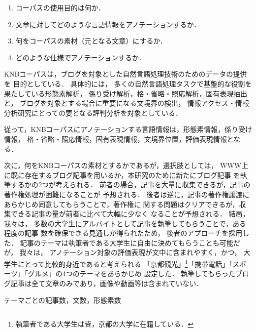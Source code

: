 \documentclass[japanese]{jnlp_JS2.0}
\begin{document}
\begin{enumerate}
 \item コーパスの使用目的は何か．
 \item 文章に対してどのような言語情報をアノテーションするか．
 \item 何をコーパスの素材（元となる文章）にするか．
 \item どのような仕様でアノテーションするか．
\end{enumerate}

KNBコーパスは，ブログを対象とした自然言語処理技術のためのデータの提供を
目的としている．
具体的には，
多くの自然言語処理タスクで基盤的な役割を果たしている形態素解析，
係り受け解析，格・省略・照応解析，固有表現抽出と，
ブログを対象とする場合に重要になる文境界の検出，
情報アクセス・情報分析研究にとっての要となる評判分析を対象としている．

従って，KNBコーパスにアノテーションする言語情報は，形態素情報，係り受け情報，
格・省略・照応情報，固有表現情報，文境界位置，評価表現情報となる．

次に，何をKNBコーパスの素材とするかであるが，選択肢としては，
WWW上に既に存在するブログ記事を用いるか，本研究のために新たにブログ記事
を執筆するかの2つが考えられる．
前者の場合，記事を大量に収集できるが，記事の著作権処理が困難になることが
予想される．
後者は逆に，記事の著作権譲渡にあらかじめ同意してもらうことで，著作権に
関する問題はクリアできるが，収集できる記事の量が前者に比べて大幅に少なく
なることが予想される．
結局，我々は，
多数の大学生にアルバイトとして記事を執筆してもらうことで，ある程度の記事
数を確保できる見通しが得られたため，
後者のアプローチを採用した．
記事のテーマは執筆者である大学生に自由に決めてもらうことも可能だが，
我々は，
アノテーション対象の評価表現が文中に含まれやすく，かつ，
大学生にとって比較的身近であると考えられる
「京都観光」\inhibitglue\footnote{執筆者である大学生は皆，京都の大学に在籍している．}「携帯電話」「スポーツ」「グルメ」の4つのテーマをあらかじめ
設定した．
執筆してもらったブログ記事は全て文章のみであり，画像や動画等は含まれていない．

\begin{table}[b]
\caption{テーマごとの記事数，文数，形態素数}
\label{tab:breakdown}

\vspace{-1\baselineskip}
\end{table}
\end{document}
